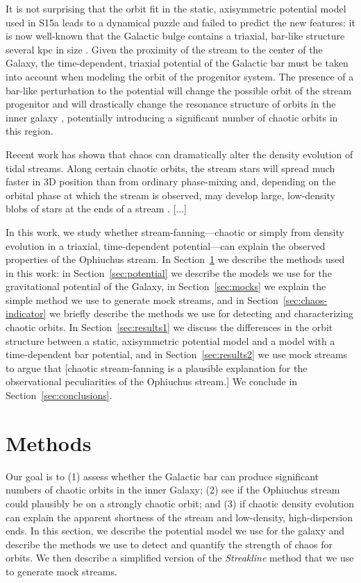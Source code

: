 \documentclass[letterpaper,12pt,preprint]{aastex}
\begin{document}
It is not surprising that the orbit fit in the static, axisymmetric potential model used in S15a leads to a dynamical puzzle and failed to predict the new features: it is now well-known that the Galactic bulge contains a triaxial, bar-like structure several kpc in size \citep[e.g.,][]{blitzXX, wegg13, MANY}. Given the proximity of the stream to the center of the Galaxy, the time-dependent, triaxial potential of the Galactic bar must be taken into account when modeling the orbit of the progenitor system. The presence of a bar-like perturbation to the potential will change the possible orbit of the stream progenitor and will drastically change the resonance structure of orbits in the inner galaxy \citep{athanassoula, MANY}, potentially introducing a significant number of chaotic orbits in this region.

Recent work has shown that chaos can dramatically alter the density evolution of tidal streams. Along certain chaotic orbits, the stream stars will spread much faster in 3D position than from ordinary phase-mixing and, depending on the orbital phase at which the stream is observed, may develop large, low-density blobs of stars at the ends of a stream \citep{apw15-chaos}. [...]

In this work, we study whether stream-fanning---chaotic or simply from density evolution in a triaxial, time-dependent potential---can explain the observed properties of the Ophiuchus stream. In Section~\ref{sec:method} we describe the methods used in this work: in Section~\ref{sec:potential} we describe the models we use for the gravitational potential of the Galaxy, in Section~\ref{sec:mocks} we explain the simple method we use to generate mock streams, and in Section~\ref{sec:chaos-indicator} we briefly describe the methods we use for detecting and characterizing chaotic orbits. In Section~\ref{sec:results1} we discuss the differences in the orbit structure between a static, axisymmetric potential model and a model with a time-dependent bar potential, and in Section~\ref{sec:results2} we use mock streams to argue that [chaotic stream-fanning is a plausible explanation for the observational peculiarities of the Ophiuchus stream.] We conclude in Section~\ref{sec:conclusions}.

\section{Methods}\label{sec:method}

Our goal is to (1) assess whether the Galactic bar can produce significant numbers of chaotic orbits in the inner Galaxy; (2) see if the Ophiuchus stream could plausibly be on a strongly chaotic orbit; and (3) if chaotic density evolution can explain the apparent shortness of the stream and low-density, high-dispersion ends. In this section, we describe the potential model we use for the galaxy and describe the methods we use to detect and quantify the strength of chaos for orbits. We then describe a simplified version of the \emph{Streakline} method \citep{kuepper12} that we use to generate mock streams.
\end{document}
